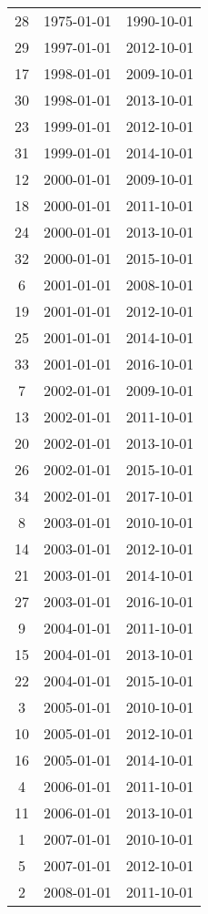 % 
\begin{tabular}{ccc}
  \hline
  \hline
28 & 1975-01-01 & 1990-10-01 \\ 
  29 & 1997-01-01 & 2012-10-01 \\ 
  17 & 1998-01-01 & 2009-10-01 \\ 
  30 & 1998-01-01 & 2013-10-01 \\ 
  23 & 1999-01-01 & 2012-10-01 \\ 
  31 & 1999-01-01 & 2014-10-01 \\ 
  12 & 2000-01-01 & 2009-10-01 \\ 
  18 & 2000-01-01 & 2011-10-01 \\ 
  24 & 2000-01-01 & 2013-10-01 \\ 
  32 & 2000-01-01 & 2015-10-01 \\ 
  6 & 2001-01-01 & 2008-10-01 \\ 
  19 & 2001-01-01 & 2012-10-01 \\ 
  25 & 2001-01-01 & 2014-10-01 \\ 
  33 & 2001-01-01 & 2016-10-01 \\ 
  7 & 2002-01-01 & 2009-10-01 \\ 
  13 & 2002-01-01 & 2011-10-01 \\ 
  20 & 2002-01-01 & 2013-10-01 \\ 
  26 & 2002-01-01 & 2015-10-01 \\ 
  34 & 2002-01-01 & 2017-10-01 \\ 
  8 & 2003-01-01 & 2010-10-01 \\ 
  14 & 2003-01-01 & 2012-10-01 \\ 
  21 & 2003-01-01 & 2014-10-01 \\ 
  27 & 2003-01-01 & 2016-10-01 \\ 
  9 & 2004-01-01 & 2011-10-01 \\ 
  15 & 2004-01-01 & 2013-10-01 \\ 
  22 & 2004-01-01 & 2015-10-01 \\ 
  3 & 2005-01-01 & 2010-10-01 \\ 
  10 & 2005-01-01 & 2012-10-01 \\ 
  16 & 2005-01-01 & 2014-10-01 \\ 
  4 & 2006-01-01 & 2011-10-01 \\ 
  11 & 2006-01-01 & 2013-10-01 \\ 
  1 & 2007-01-01 & 2010-10-01 \\ 
  5 & 2007-01-01 & 2012-10-01 \\ 
  2 & 2008-01-01 & 2011-10-01 \\ 
   \hline
\end{tabular}
